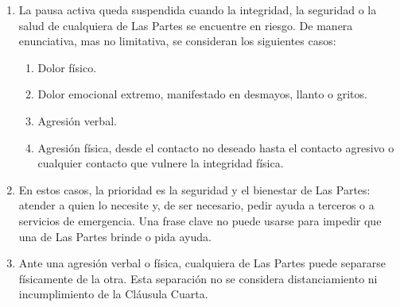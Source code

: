 \begin{enumerate}[label=\arabic*., leftmargin=*, itemsep=0.3em]
  \item La pausa activa queda suspendida cuando la integridad, la seguridad o la salud de cualquiera de Las Partes se encuentre en riesgo. De manera enunciativa, mas no limitativa, se consideran los siguientes casos:
  \begin{enumerate}[label=\alph*), itemsep=0.2em]
    \item Dolor físico.
    \item Dolor emocional extremo, manifestado en desmayos, llanto o gritos.
    \item Agresión verbal.
    \item Agresión física, desde el contacto no deseado hasta el contacto agresivo o cualquier contacto que vulnere la integridad física.
  \end{enumerate}

  \item En estos casos, la prioridad es la seguridad y el bienestar de Las Partes: atender a quien lo necesite y, de ser necesario, pedir ayuda a terceros o a servicios de emergencia. Una frase clave no puede usarse para impedir que una de Las Partes brinde o pida ayuda.

  \item Ante una agresión verbal o física, cualquiera de Las Partes puede separarse físicamente de la otra. Esta separación no se considera distanciamiento ni incumplimiento de la Cláusula Cuarta.
\end{enumerate}


